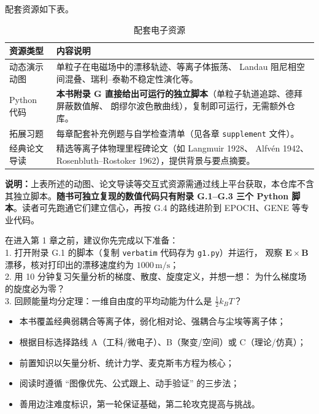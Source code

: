 \documentclass[12pt,a4paper,openany,oneside]{book}
\newcommand{\vect}[1]{\bm{#1}}
\begin{document}
配套资源如下表。

\begin{table}[htbp]
\centering
\caption{配套电子资源}
\begin{tabular}{@{}lp{9cm}@{}}
\toprule
\textbf{资源类型} & \textbf{内容说明} \\
\midrule
动态演示动图 & 单粒子在电磁场中的漂移轨迹、等离子体振荡、
Landau 阻尼相空间混叠、瑞利--泰勒不稳定性演化等。 \\
Python 代码 & \textbf{本书附录 G 直接给出可运行的独立脚本}（单粒子轨道追踪、德拜屏蔽数值解、
朗缪尔波色散曲线），复制即可运行，无需额外仓库。 \\
拓展习题 & 每章配套补充例题与自学检查清单（见各章 \texttt{supplement} 文件）。 \\
经典论文导读 & 精选等离子体物理里程碑论文（如 Langmuir 1928、
Alfv\'{e}n 1942、Rosenbluth--Rostoker 1962），提供背景与要点摘要。 \\
\bottomrule
\end{tabular}
\end{table}

\textbf{说明：}上表所述的动图、论文导读等交互式资源需通过线上平台获取，本仓库不含其独立脚本。\textbf{随书可独立复现的数值代码只有附录 G.1--G.3 三个 Python 脚本}。读者可先跑通它们建立信心，再按 G.4 的路线进阶到 EPOCH、GENE 等专业代码。

\begin{miniquiz}[title={进入第 1 章之前的三项准备}]
在进入第 1 章之前，建议你先完成以下准备：\\
1. 打开附录 G.1 的脚本（复制 \texttt{verbatim} 代码存为 \texttt{g1.py}）并运行，
观察 $\vect{E}\times\vect{B}$ 漂移，核对打印出的漂移速度约为 $1000\,\mathrm{m/s}$；\\
2. 用 10 分钟复习矢量分析的梯度、散度、旋度定义，并想一想：
为什么梯度场的旋度必为零？\\
3. 回顾能量均分定理：一维自由度的平均动能为什么是 $\frac12k_BT$？
\end{miniquiz}

\begin{chapterreview}
\begin{itemize}
\item 本书覆盖经典弱耦合等离子体，弱化相对论、强耦合与尘埃等离子体；
\item 根据目标选择路线 A（工科/微电子）、B（聚变/空间）或 C（理论/仿真）；
\item 前置知识以矢量分析、统计力学、麦克斯韦方程为核心；
\item 阅读时遵循 ``图像优先、公式跟上、动手验证'' 的三步法；
\item 善用边注难度标识，第一轮保证基础，第二轮攻克提高与挑战。
\end{itemize}
\end{chapterreview}
\end{document}
